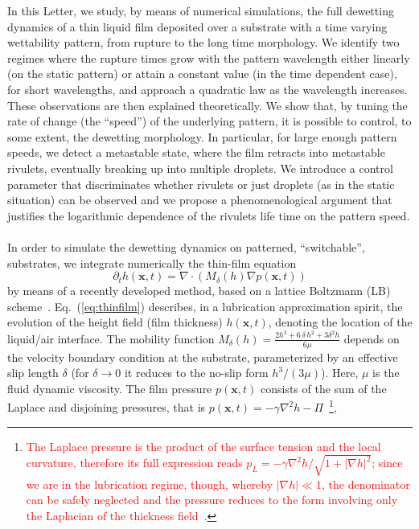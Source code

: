 \documentclass[twocolumn,amsmath,amssymb,showpacs,prl,superscriptaddress]{revtex4-1} %
\begin{document}
In this Letter, we study, by means of numerical simulations, the full dewetting dynamics of a thin liquid film deposited over a substrate with a time varying wettability pattern, from rupture to the long time morphology. 
We identify two regimes where the rupture times grow with the pattern wavelength either linearly (on the static pattern) or attain a constant value (in the time dependent case), for short wavelengths, and approach a quadratic law as the wavelength increases. These observations are then explained theoretically.
We show that, by tuning the rate of change (the ``speed'') of the underlying pattern, it is possible to control, to some extent, the dewetting morphology. In particular, for large enough pattern speeds, we detect a metastable state, where the film retracts into metastable rivulets, eventually breaking up into multiple droplets.
We introduce a control parameter that discriminates whether rivulets or just droplets (as in the static situation)
can be observed and we propose a phenomenological argument that justifies the logarithmic dependence of the rivulets life time on the pattern speed.\\
\\
 In order to simulate the dewetting dynamics on patterned, ``switchable'', substrates, we integrate numerically the thin-film equation~\cite{ReynoldsLubr,RevModPhys.69.931,RevModPhys.81.1131} 
\begin{equation}\label{eq:thinfilm}
    \partial_t h(\mathbf{x},t) = \nabla\cdot\left(M_{\delta}(h)\nabla p(\mathbf{x},t)\right)
\end{equation}
by means of a recently developed method, based on a lattice Boltzmann (LB) scheme~\cite{PhysRevE.100.033313,PhysRevE.104.034801, Zitz2022}.
Eq.~(\ref{eq:thinfilm}) describes, in a lubrication approximation spirit, the evolution of the height field (film thickness) $h(\mathbf{x},t)$, denoting the location of the liquid/air interface. The mobility function 
$M_{\delta}(h) = \frac{2h^3 + 6\,\delta\, h^2 + 3\delta^2h}{6\mu}$
depends on the velocity boundary condition at the substrate, parameterized by an effective slip length $\delta$
(for $\delta \rightarrow 0$ it reduces to the no-slip form $h^3/(3\mu)$). Here, $\mu$ is the fluid dynamic viscosity.
The film pressure $p(\mathbf{x},t)$ consists of the sum of the Laplace and disjoining pressures, that is $p(\mathbf{x},t) = -\gamma \nabla^2 h - \Pi$~\footnote{\textcolor{red}{The Laplace pressure is the product of the surface tension 
and the local curvature, therefore its full expression reads $p_L = -\gamma \nabla^2 h/\sqrt{1+|\nabla h|^2}$; 
since we are in the lubrication regime, though, whereby $|\nabla h| \ll 1$, the denominator can be safely neglected 
and the pressure reduces to the form involving only the Laplacian of the thickness 
field~\cite{Benet2014,juanes2018}.}}, 
\end{document}
